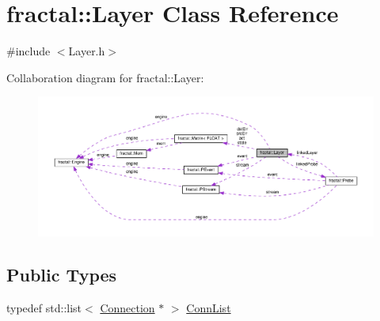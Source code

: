 \hypertarget{classfractal_1_1Layer}{\section{fractal\+:\+:Layer Class Reference}
\label{classfractal_1_1Layer}
}


{\ttfamily \#include $<$Layer.\+h$>$}



Collaboration diagram for fractal\+:\+:Layer\+:\nopagebreak
\begin{figure}[H]
\begin{center}
\leavevmode
\includegraphics[width=350pt]{d0/d56/classfractal_1_1Layer__coll__graph}
\end{center}
\end{figure}
\subsection*{Public Types}
\begin{DoxyCompactItemize}
\item 
typedef std\+::list$<$ \hyperlink{classfractal_1_1Connection}{Connection} $\ast$ $>$ \hyperlink{classfractal_1_1Layer_a112ea548588704c0915a32aa3269b5a6}{Conn\+List}
\end{DoxyCompactItemize}
